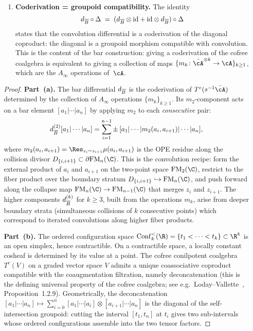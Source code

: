 \begin{proposition}
\begin{enumerate}[label=\textup{(\alph*)}]
\item \textbf{Coderivation = groupoid compatibility.}
 The identity
 \[
 d_{\overline{B}} \circ \Delta
 \;=\;
 (d_{\overline{B}} \otimes \mathrm{id}
 + \mathrm{id} \otimes d_{\overline{B}})
 \circ \Delta
 \]
 states that the convolution differential is a coderivation of the
 diagonal coproduct: the diagonal is a groupoid morphism compatible
 with convolution. This is the content of the bar construction:
 giving a coderivation of the cofree coalgebra is equivalent to
 giving a collection of maps\/
 $\{m_k \colon \bar{\cA}^{\otimes k} \to \cA\}_{k \geq 1}$,
 which are the\/ $A_\infty$ operations of~$\cA$.
\end{enumerate}
\end{proposition}

\begin{proof}
\textbf{Part~(a).}
The bar differential $d_{\overline{B}}$ is the coderivation of
$T^c(s^{-1}\bar{\cA})$ determined by the collection of
$A_\infty$ operations $\{m_k\}_{k \geq 1}$. Its $m_2$-component
acts on a bar element $[a_1|\cdots|a_n]$ by applying $m_2$ to each
\emph{consecutive} pair:
\[
 d_{\overline{B}}^{(2)}[a_1|\cdots|a_n]
 = \sum_{i=1}^{n-1}
 \pm\, [a_1|\cdots|m_2(a_i,a_{i+1})|\cdots|a_n],
\]
where $m_2(a_i,a_{i+1}) = \Res_{z_i = z_{i+1}} \mu(a_i,a_{i+1})$
is the OPE residue along the collision divisor
$D_{\{i,i+1\}} \subset \partial\FM_n(\C)$. This is the
convolution recipe: form the external product of $a_i$ and
$a_{i+1}$ on the two-point space $\FM_2(\C)$, restrict to the
fiber product over the boundary stratum
$D_{\{i,i+1\}} \hookrightarrow \FM_n(\C)$, and push forward along
the collapse map $\FM_n(\C) \to \FM_{n-1}(\C)$ that merges
$z_i$ and $z_{i+1}$. The higher components $d_{\overline{B}}^{(k)}$
for $k \geq 3$, built from the operations $m_k$, arise from
deeper boundary strata (simultaneous collisions of $k$
consecutive points) which correspond to iterated convolutions
along higher fiber products.

\textbf{Part~(b).}
The ordered configuration space $\Conf_k^{<}(\R) = \{t_1 < \cdots
< t_k\} \subset \R^k$ is an open simplex, hence contractible.
On a contractible space, a locally constant cosheaf is determined by
its value at a point. The cofree conilpotent coalgebra
$T^c(V)$ on a graded vector space $V$ admits a unique coassociative
coproduct compatible with the coaugmentation filtration, namely
deconcatenation (this is the defining universal property of the
cofree coalgebra; see e.g.\ Loday--Vallette~\cite{LV12},
Proposition~1.2.9). Geometrically, the deconcatenation
$[a_1|\cdots|a_n] \mapsto \sum_{i=0}^{n} [a_1|\cdots|a_i] \otimes
[a_{i+1}|\cdots|a_n]$ is the diagonal of the self-intersection
groupoid: cutting the interval $[t_1,t_n]$ at $t_i$ gives two
sub-intervals whose ordered configurations assemble into the two
tensor factors.


\end{proof}
